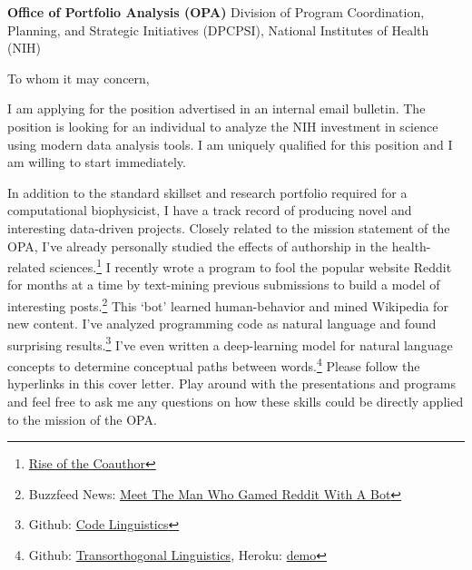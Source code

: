 \documentclass[]{scrartcl}
\begin{document}
\begin{cleanCV}

  \vspace{2em}
  \begin{raggedright}
    \textbf{Office of Portfolio Analysis (OPA)} \newline
    \hangindent=0.7cm \indent Division of Program Coordination, Planning,
    and {Strategic Initiatives} (DPCPSI),
    National Institutes of Health (NIH)
  \end{raggedright}
  
  \vspace{2em}

  To whom it may concern,

  \vspace{1em}
  \setlength{\parskip}{1em}
  
  I am applying for the position advertised in an internal email bulletin.
  The position is looking for an individual to analyze the NIH investment in science using modern data analysis tools.
  I am uniquely qualified for this position and I am willing to start immediately.

  In addition to the standard skillset and research portfolio required for a computational biophysicist, I have a track record of producing novel and interesting data-driven projects.
  Closely related to the mission statement of the OPA, I've already personally studied the effects of authorship in the health-related sciences.\footnote{
    \href{http://thoppe.github.io/Presentation_Rise_of_the_Coauthor}{Rise of the Coauthor}
  }
  I recently wrote a program to fool the popular website Reddit for months at a time by text-mining previous submissions to build a model of interesting posts.\footnote{
    Buzzfeed News: \href{http://www.buzzfeed.com/hamzashaban/today-ai-learned}{Meet The Man Who Gamed Reddit With A Bot}
  }
  This `bot' learned human-behavior and mined Wikipedia for new content.
  I've analyzed programming code as natural language and found surprising results.\footnote{
    Github: \href{http://thoppe.github.io/code-linguistics/HnC_presentation.html}{Code Linguistics}
  }
  I've even written a deep-learning model for natural language concepts to determine conceptual paths between words.\footnote{
    Github: \href{https://github.com/thoppe/transorthogonal-linguistics}{Transorthogonal Linguistics}, Heroku: \href{http://transorthogonal-linguistics.herokuapp.com/TOL/boy/man}{demo}
  }
  Please follow the hyperlinks in this cover letter.
  Play around with the presentations and programs and feel free to ask me any questions on how these skills could be directly applied to the mission of the OPA.


\end{cleanCV}
\end{document}
